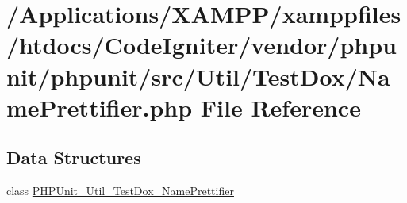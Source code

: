 \hypertarget{_name_prettifier_8php}{}\section{/\+Applications/\+X\+A\+M\+P\+P/xamppfiles/htdocs/\+Code\+Igniter/vendor/phpunit/phpunit/src/\+Util/\+Test\+Dox/\+Name\+Prettifier.php File Reference}
\label{_name_prettifier_8php}
\subsection*{Data Structures}
\begin{DoxyCompactItemize}
\item 
class \mbox{\hyperlink{class_p_h_p_unit___util___test_dox___name_prettifier}{P\+H\+P\+Unit\+\_\+\+Util\+\_\+\+Test\+Dox\+\_\+\+Name\+Prettifier}}
\end{DoxyCompactItemize}
